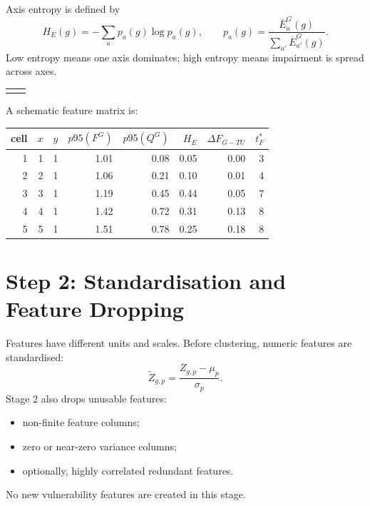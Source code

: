 \documentclass[11pt]{article}
\newcommand{\cellbox}[2]{\fill[#1] #2 rectangle ++(0.8,0.8);}
\newcommand{\gridframe}{\draw[black!40,step=0.8] (0,0) grid (4,4);}
\newcommand{\rastlabel}[1]{\node[font=\scriptsize,align=center] at (2,-0.35) {#1};}
\newcommand{\drawRasterAxis}{%
\begin{tikzpicture}[scale=0.58]
\cellbox{lowred}{(0,0)} \cellbox{midred}{(0.8,0)} \cellbox{midred}{(1.6,0)} \cellbox{highred}{(2.4,0)} \cellbox{highred}{(3.2,0)}
\cellbox{lowred}{(0,0.8)} \cellbox{midred}{(0.8,0.8)} \cellbox{highred}{(1.6,0.8)} \cellbox{highred}{(2.4,0.8)} \cellbox{highred}{(3.2,0.8)}
\cellbox{midred}{(0,1.6)} \cellbox{highred}{(0.8,1.6)} \cellbox{highred}{(1.6,1.6)} \cellbox{highred}{(2.4,1.6)} \cellbox{midred}{(3.2,1.6)}
\cellbox{midred}{(0,2.4)} \cellbox{highred}{(0.8,2.4)} \cellbox{highred}{(1.6,2.4)} \cellbox{midred}{(2.4,2.4)} \cellbox{lowred}{(3.2,2.4)}
\cellbox{lowred}{(0,3.2)} \cellbox{midred}{(0.8,3.2)} \cellbox{midred}{(1.6,3.2)} \cellbox{lowred}{(2.4,3.2)} \cellbox{lowred}{(3.2,3.2)}
\gridframe\rastlabel{$E_{M}^{G}$: maintenance impairment}
\end{tikzpicture}}
\newcommand{\drawRasterFeature}{%
\begin{tikzpicture}[scale=0.58]
\cellbox{purpleA}{(0,0)} \cellbox{purpleA}{(0.8,0)} \cellbox{purpleB}{(1.6,0)} \cellbox{purpleB}{(2.4,0)} \cellbox{purpleC}{(3.2,0)}
\cellbox{purpleA}{(0,0.8)} \cellbox{purpleB}{(0.8,0.8)} \cellbox{purpleB}{(1.6,0.8)} \cellbox{purpleC}{(2.4,0.8)} \cellbox{purpleC}{(3.2,0.8)}
\cellbox{purpleB}{(0,1.6)} \cellbox{purpleC}{(0.8,1.6)} \cellbox{purpleC}{(1.6,1.6)} \cellbox{purpleC}{(2.4,1.6)} \cellbox{purpleB}{(3.2,1.6)}
\cellbox{purpleB}{(0,2.4)} \cellbox{purpleC}{(0.8,2.4)} \cellbox{purpleB}{(1.6,2.4)} \cellbox{purpleB}{(2.4,2.4)} \cellbox{purpleA}{(3.2,2.4)}
\cellbox{purpleA}{(0,3.2)} \cellbox{purpleB}{(0.8,3.2)} \cellbox{purpleA}{(1.6,3.2)} \cellbox{purpleA}{(2.4,3.2)} \cellbox{purpleA}{(3.2,3.2)}
\gridframe\rastlabel{$p95(F^G)$ feature map}
\end{tikzpicture}}
\begin{document}
Axis entropy is defined by
\begin{equation}
H_E(g)=-\sum_a p_a(g)\log p_a(g),\qquad
p_a(g)=\frac{\overline{E}_a^G(g)}{\sum_{a'}\overline{E}_{a'}^G(g)}.
\end{equation}
Low entropy means one axis dominates; high entropy means impairment is spread across axes.

\begin{center}
\begin{tabular}{cc}
\drawRasterAxis & \drawRasterFeature\\
\end{tabular}
\end{center}

A schematic feature matrix is:
\begin{center}
\small
\begin{tabular}{rrrrrrrr}
\toprule
cell & $x$ & $y$ & $p95(F^G)$ & $p95(Q^G)$ & $H_E$ & $\Delta F_{G-TU}$ & $t^*_F$\\
\midrule
1 & 1 & 1 & 1.01 & 0.08 & 0.05 & 0.00 & 3\\
2 & 2 & 1 & 1.06 & 0.21 & 0.10 & 0.01 & 4\\
3 & 3 & 1 & 1.19 & 0.45 & 0.44 & 0.05 & 7\\
4 & 4 & 1 & 1.42 & 0.72 & 0.31 & 0.13 & 8\\
5 & 5 & 1 & 1.51 & 0.78 & 0.25 & 0.18 & 8\\
\bottomrule
\end{tabular}
\end{center}

\section{Step 2: Standardisation and Feature Dropping}
Features have different units and scales. Before clustering, numeric features are standardised:
\begin{equation}
\widetilde{Z}_{g,p}=\frac{Z_{g,p}-\mu_p}{\sigma_p}.
\end{equation}
Stage 2 also drops unusable features:
\begin{itemize}
\item non-finite feature columns;
\item zero or near-zero variance columns;
\item optionally, highly correlated redundant features.
\end{itemize}
No new vulnerability features are created in this stage.
\end{document}
